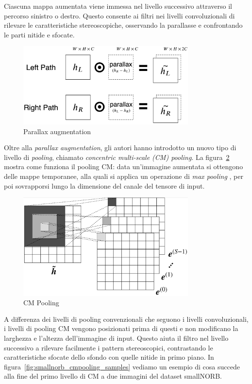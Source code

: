 \documentclass[italian,12pt,a4paper,oneside,final]{report}
\begin{document}
\noindent Ciascuna mappa aumentata viene immessa nel livello successivo attraverso il percorso sinistro o destro.
Questo consente ai filtri nei livelli convoluzionali di rilevare le caratteristiche stereoscopiche, osservando la parallasse e confrontando le parti nitide e sfocate.
\begin{figure}[!ht]
	\centering
	\includegraphics[width=0.8\textwidth]{parallax.png}
	\caption{Parallax augmentation}
	\label{fig:cnn2_parallax}
\end{figure}

\noindent Oltre alla \textit{parallax augmentation}, gli autori hanno introdotto un nuovo tipo di livello di \textit{pooling}, chiamato \textit{concentric multi-scale (CM) pooling}.
La figura~\ref{fig:cnn2_cmpooling} mostra come funziona il pooling CM: data un'immagine aumentata si ottengono delle mappe temporanee, alla quali si applica un operazione di \textit{max pooling }, per poi sovrapporsi lungo la dimensione del canale del tensore di input.
\begin{figure}[ht]
	\centering
	\includegraphics[width=0.8\textwidth]{cmpooling.png}
	\caption{CM Pooling}
	\label{fig:cnn2_cmpooling}
\end{figure}

\noindent A differenza dei livelli di pooling convenzionali che seguono i livelli convoluzionali, i livelli di pooling CM vengono posizionati prima di questi e non modificano la larghezza e l'altezza dell'immagine di input.
Questo aiuta il filtro nel livello successivo a rilevare facilmente i pattern stereoscopici, contrastando le caratteristiche sfocate dello sfondo con quelle nitide in primo piano.
In figura~\ref{fig:smallnorb_cmpooling_samples} vediamo un esempio di cosa succede alla fine del primo livello di CM a due immagini del dataset smallNORB. 
\end{document}
